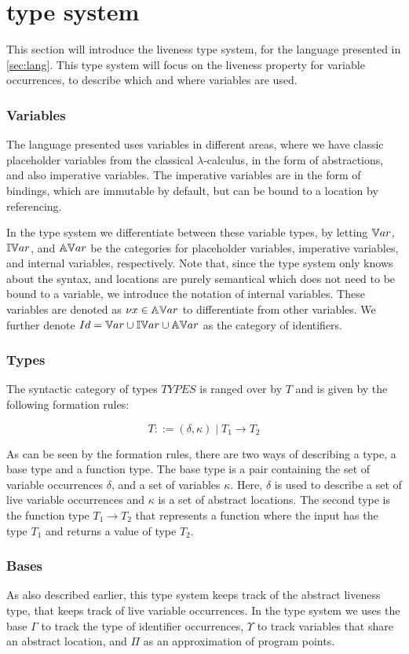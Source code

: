 \documentclass[../../master.tex]{subfiles}
\begin{document}
\section{type system}
This section will introduce the liveness type system, for the language presented in \cref{sec:lang}.
This type system will focus on the liveness property for variable occurrences, to describe which and where variables are used.

\subsubsection{Variables}
The language presented uses variables in different areas, where we have classic placeholder variables from the classical $\lambda$-calculus, in the form of abstractions, and also imperative variables.
The imperative variables are in the form of bindings, which are immutable by default, but can be bound to a location by referencing.

In the type system we differentiate between these variable types, by letting $\mathbb{V}ar$, $\mathbb{IV}ar$, and $\mathbb{AV}ar$ be the categories for placeholder variables, imperative variables, and internal variables, respectively.
Note that, since the type system only knows about the syntax, and locations are purely semantical which does not need to be bound to a variable, we introduce the notation of internal variables.
These variables are denoted as $\nu x\in\mathbb{AV}ar$ to differentiate from other variables.
We further denote $Id=\mathbb{V}ar\cup\mathbb{IV}ar\cup\mathbb{AV}ar$ as the category of identifiers.

\subsubsection{Types}
The syntactic category of types $TYPES$ is ranged over by $T$ and is given by the following formation rules:

$$T::=(\delta,\kappa)\mid T_1 \rightarrow T_2$$

As can be seen by the formation rules, there are two ways of describing a type, a base type and a function type.
The base type is a pair containing the set of variable occurrences $\delta$, and a set of variables $\kappa$.
Here, $\delta$ is used to describe a set of live variable occurrences and $\kappa$ is a set of abstract locations.
The second type is the function type $T_1\rightarrow T_2$ that represents a function where the input has the type $T_1$ and returns a value of type $T_2$.

\subsubsection{Bases}
As also described earlier, this type system keeps track of the abstract liveness type, that keeps track of live variable occurrences.
In the type system we uses the base $\Gamma$ to track the type of identifier occurrences, $\Upsilon$ to track variables that share an abstract location, and $\Pi$ as an approximation of program points.
\end{document}
